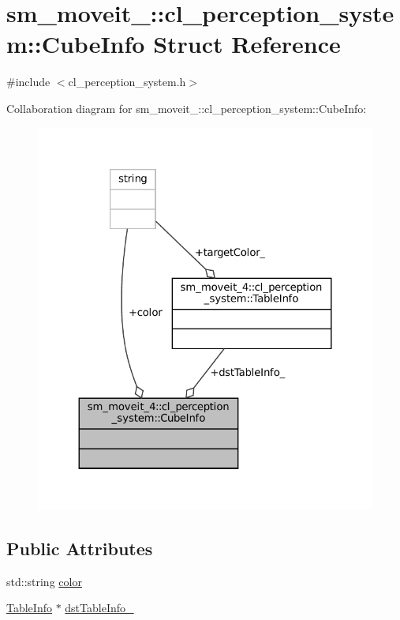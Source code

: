 \hypertarget{structsm__moveit__4_1_1cl__perception__system_1_1CubeInfo}{}\section{sm\+\_\+moveit\+\_\+:\+:cl\+\_\+perception\+\_\+system\+:\+:Cube\+Info Struct Reference}
\label{structsm__moveit__4_1_1cl__perception__system_1_1CubeInfo}


{\ttfamily \#include $<$cl\+\_\+perception\+\_\+system.\+h$>$}



Collaboration diagram for sm\+\_\+moveit\+\_\+:\+:cl\+\_\+perception\+\_\+system\+:\+:Cube\+Info\+:
\nopagebreak
\begin{figure}[H]
\begin{center}
\leavevmode
\includegraphics[width=324pt]{structsm__moveit__4_1_1cl__perception__system_1_1CubeInfo__coll__graph}
\end{center}
\end{figure}
\subsection*{Public Attributes}
\begin{DoxyCompactItemize}
\item 
std\+::string \hyperlink{structsm__moveit__4_1_1cl__perception__system_1_1CubeInfo_a4ef8b67fac001c6d11348ecc26bc03d6}{color}
\item 
\hyperlink{structsm__moveit__4_1_1cl__perception__system_1_1TableInfo}{Table\+Info} $\ast$ \hyperlink{structsm__moveit__4_1_1cl__perception__system_1_1CubeInfo_a37db1abe10a6008d248a40981e026fff}{dst\+Table\+Info\+\_\+}
\end{DoxyCompactItemize}


